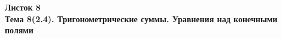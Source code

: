 \documentclass[a4paper, 11pt]{article}
\begin{document}
\begin{center} \Large \bf Листок 8\\ Тема 8(2.4). Тригонометрические суммы. Уравнения над конечными полями \end{center}


\end{document}

